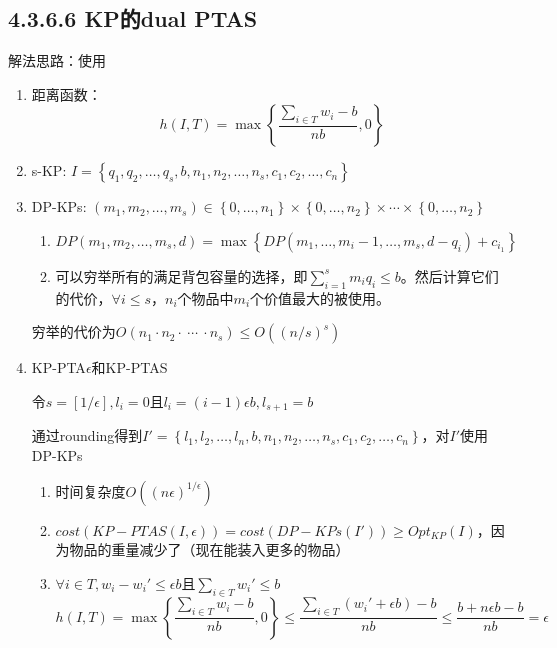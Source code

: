 \documentclass{article}
\begin{document}
	\subsection*{4.3.6.6 KP的dual PTAS}
	解法思路：使用\par 
	\begin{enumerate}[Step 1:]
		\item 距离函数：
		$$h(I,T)=\max \left\{\frac{\sum_{i\in T}w_i-b}{nb},0\right\}$$
		\item s-KP: $I=\left\{q_1,q_2,\dots,q_s,b,n_1,n_2,\dots,n_s,c_1,c_2,\dots, c_n\right\}$
		\item DP-KPs: $(m_1,m_2,\dots,m_s)\in \left\{0,\dots,n_1\right\}\times \left\{0,\dots,n_2\right\}\times \cdots \times \left\{0,\dots,n_2\right\}$
		\begin{enumerate}[1.]
			\item $DP(m_1,m_2,\dots,m_s,d)=\max\left\{DP(m_1,\dots,m_i-1,\dots,m_s,d-q_i)+c_{i_1}\right\}$
			\item 
			可以穷举所有的满足背包容量的选择，即$\sum_{i=1}^{s}m_iq_i\le b$。然后计算它们的代价，$\forall i\le s$，$n_i$个物品中$m_i$个价值最大的被使用。
		\end{enumerate}
	穷举的代价为$O(n_1\cdot n_2\cdot\ \cdots\ \cdot n_s)\le O\left(\left(n/s\right)^s\right)$
	\item 
	KP-PTA$\epsilon$和KP-PTAS\par 
	令$s=[1/\epsilon],l_i=0$且$l_i=(i-1)\epsilon b,l_{s+1}=b$\par 
	通过rounding得到$I'=\left\{l_1,l_2,\dots,l_n,b,n_1,n_2,\dots,n_s,c_1,c_2,\dots,c_n\right\}$，对$I'$使用DP-KPs
	\begin{enumerate}[1.]
		\item 时间复杂度$O\left((n\epsilon)^{1/\epsilon}\right)$
		\item $cost(KP-PTAS(I,\epsilon))=cost(DP-KPs(I'))\ge Opt_{KP}(I)$，因为物品的重量减少了（现在能装入更多的物品）
		\item $\forall i\in T,w_i-w_i'\le \epsilon b$且$\sum_{i\in T}w_i'\le b$
		$$h(I,T)=\max \left\{\frac{\sum_{i\in T}w_i-b}{nb}, 0\right\}\le \frac{\sum_{i\in T}(w_i'+\epsilon b)-b}{nb}\le \frac{b+n\epsilon b-b}{nb}=\epsilon$$
	\end{enumerate}
	\end{enumerate}
\end{document}
